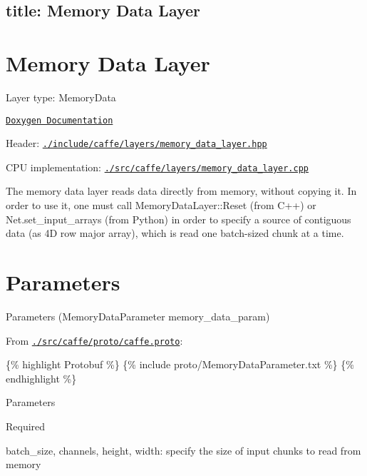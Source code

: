 

 \subsection*{title\+: Memory Data Layer }

\section*{Memory Data Layer}


\begin{DoxyItemize}
\item Layer type\+: {\ttfamily Memory\+Data}
\item \href{http://caffe.berkeleyvision.org/doxygen/classcaffe_1_1MemoryDataLayer.html}{\tt Doxygen Documentation}
\item Header\+: \href{https://github.com/BVLC/caffe/blob/master/include/caffe/layers/memory_data_layer.hpp}{\tt {\ttfamily ./include/caffe/layers/memory\+\_\+data\+\_\+layer.hpp}}
\item C\+PU implementation\+: \href{https://github.com/BVLC/caffe/blob/master/src/caffe/layers/memory_data_layer.cpp}{\tt {\ttfamily ./src/caffe/layers/memory\+\_\+data\+\_\+layer.cpp}}
\end{DoxyItemize}

The memory data layer reads data directly from memory, without copying it. In order to use it, one must call {\ttfamily Memory\+Data\+Layer\+::\+Reset} (from C++) or {\ttfamily Net.\+set\+\_\+input\+\_\+arrays} (from Python) in order to specify a source of contiguous data (as 4D row major array), which is read one batch-\/sized chunk at a time.

\section*{Parameters}


\begin{DoxyItemize}
\item Parameters ({\ttfamily Memory\+Data\+Parameter memory\+\_\+data\+\_\+param})
\item From \href{https://github.com/BVLC/caffe/blob/master/src/caffe/proto/caffe.proto}{\tt {\ttfamily ./src/caffe/proto/caffe.proto}}\+:
\end{DoxyItemize}

\{\% highlight Protobuf \%\} \{\% include proto/\+Memory\+Data\+Parameter.\+txt \%\} \{\% endhighlight \%\}


\begin{DoxyItemize}
\item Parameters
\begin{DoxyItemize}
\item Required
\begin{DoxyItemize}
\item {\ttfamily batch\+\_\+size}, {\ttfamily channels}, {\ttfamily height}, {\ttfamily width}\+: specify the size of input chunks to read from memory 
\end{DoxyItemize}
\end{DoxyItemize}
\end{DoxyItemize}